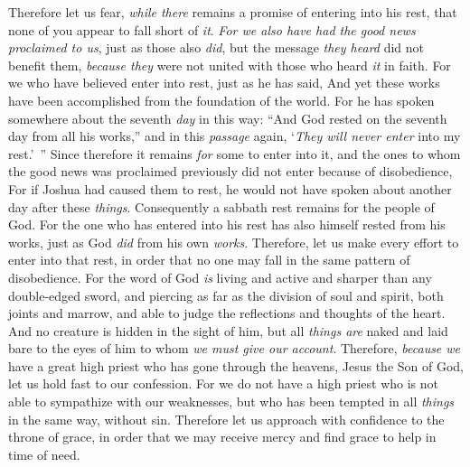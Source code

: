 \begin{biblechapter} %
 Therefore let us fear, \textit{while there} remains a promise of entering into his rest, that none of you appear to fall short of \textit{it}.
\verse \textit{For we also have had the good news proclaimed to us}, just as those also \textit{did}, but the message \textit{they heard} did not benefit them, \textit{because they} were not united with those who heard \textit{it} in faith.
\verse For we who have believed enter into rest, just as he has said,
\verse And yet these works have been accomplished from the foundation of the world.
\verse For he has spoken somewhere about the seventh \textit{day} in this way: “And God rested on the seventh day from all his works,”
\verse and in this \textit{passage} again, ‘\textit{They will never enter} into my rest.’ ”
\verse Since therefore it remains \textit{for} some to enter into it, and the ones to whom the good news was proclaimed previously did not enter because of disobedience,
\verse For if Joshua had caused them to rest, he would not have spoken about another day after these \textit{things}.
\verse Consequently a sabbath rest remains for the people of God.
\verse For the one who has entered into his rest has also himself rested from his works, just as God \textit{did} from his own \textit{works}.
\verse Therefore, let us make every effort to enter into that rest, in order that no one may fall in the same pattern of disobedience.
\verse For the word of God \textit{is} living and active and sharper than any double-edged sword, and piercing as far as the division of soul and spirit, both joints and marrow, and able to judge the reflections and thoughts of the heart.
\verse And no creature is hidden in the sight of him, but all \textit{things are} naked and laid bare to the eyes of him to whom \textit{we must give our account}.
 Therefore, \textit{because we} have a great high priest who has gone through the heavens, Jesus the Son of God, let us hold fast to our confession.
\verse For we do not have a high priest who is not able to sympathize with our weaknesses, but who has been tempted in all \textit{things} in the same way, without sin.
\verse Therefore let us approach with confidence to the throne of grace, in order that we may receive mercy and find grace to help in time of need.
\end{biblechapter}

